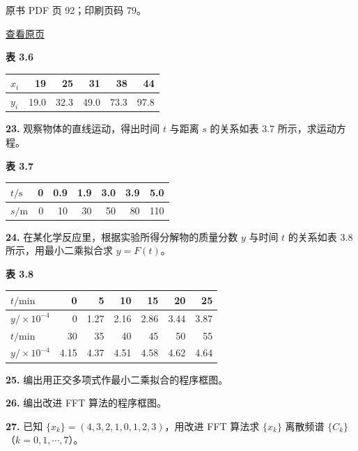 \clearpage

原书 PDF 页 92；印刷页码 79。

\href{source-images/pdf-092.jpeg}{查看原页}

\textbf{表 3.6}

{\def\LTcaptype{none} %
\begin{longtable}[]{@{}lrrrrr@{}}
\toprule\noalign{}
\(x_i\) & 19 & 25 & 31 & 38 & 44 \\
\midrule\noalign{}
\endhead
\bottomrule\noalign{}
\endlastfoot
\(y_i\) & 19.0 & 32.3 & 49.0 & 73.3 & 97.8 \\
\end{longtable}
}

\textbf{23.} 观察物体的直线运动，得出时间 \(t\) 与距离 \(s\) 的关系如表 3.7 所示，求运动方程。

\textbf{表 3.7}

{\def\LTcaptype{none} %
\begin{longtable}[]{@{}lrrrrrr@{}}
\toprule\noalign{}
\(t/\mathrm s\) & 0 & 0.9 & 1.9 & 3.0 & 3.9 & 5.0 \\
\midrule\noalign{}
\endhead
\bottomrule\noalign{}
\endlastfoot
\(s/\mathrm m\) & 0 & 10 & 30 & 50 & 80 & 110 \\
\end{longtable}
}

\textbf{24.} 在某化学反应里，根据实验所得分解物的质量分数 \(y\) 与时间 \(t\) 的关系如表 3.8 所示，用最小二乘拟合求 \(y=F(t)\)。

\textbf{表 3.8}

{\def\LTcaptype{none} %
\begin{longtable}[]{@{}lrrrrrr@{}}
\toprule\noalign{}
\(t/\mathrm{min}\) & 0 & 5 & 10 & 15 & 20 & 25 \\
\midrule\noalign{}
\endhead
\bottomrule\noalign{}
\endlastfoot
\(y/\times10^{-4}\) & 0 & 1.27 & 2.16 & 2.86 & 3.44 & 3.87 \\
\(t/\mathrm{min}\) & 30 & 35 & 40 & 45 & 50 & 55 \\
\(y/\times10^{-4}\) & 4.15 & 4.37 & 4.51 & 4.58 & 4.62 & 4.64 \\
\end{longtable}
}

\textbf{25.} 编出用正交多项式作最小二乘拟合的程序框图。

\textbf{26.} 编出改进 FFT 算法的程序框图。

\textbf{27.} 已知 \(\{x_k\}=(4,3,2,1,0,1,2,3)\)，用改进 FFT 算法求 \(\{x_k\}\) 离散频谱 \(\{C_k\}\)（\(k=0,1,\cdots,7\)）。

